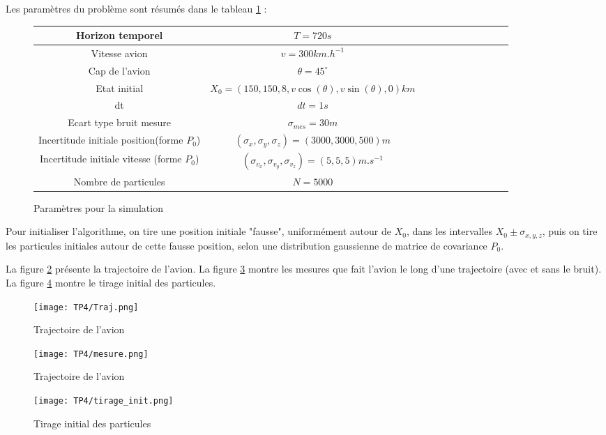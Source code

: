 \documentclass{article}
\begin{document}
Les paramètres du problème sont résumés dans le tableau \ref{paramètres2} : 


\begin{figure}[h!]
   \centering
   \caption{Paramètres pour la simulation}
   \label{paramètres2}
   \begin{tabular}{|*{11}{c|}}
     \hline Horizon temporel & $T = 720 s$ \\
     \hline Vitesse avion & $v=300 km.h^{-1}$\\
     \hline Cap de l'avion & $\theta = 45^\circ$\\
     \hline Etat initial & $X_0 =\left(150,150,8,v \cos(\theta),v \sin(\theta),0\right) km $\\ 
      \hline dt  & $dt = 1 s$ \\
      \hline Ecart type bruit mesure & $\sigma_{mes}=30 m$\\
      \hline Incertitude initiale position(forme $P_0$)& $(\sigma_x,\sigma_y,\sigma_z)=(3000,3000,500) m$\\
      \hline Incertitude initiale vitesse (forme $P_0$)&$(\sigma_{v_{x}},\sigma_{v_{y}},\sigma_{v_{z}})=(5,5,5) m.s^{-1}$\\
      \hline Nombre de particules & $N=5000$ \\
      \hline
   \end{tabular}
 \end{figure}
 
 Pour initialiser l'algorithme, on tire une position initiale "fausse", uniformément autour de $X_0$, dans les intervalles
 $X_0 \pm \sigma_{x,y,z}$, puis on tire les particules initiales autour de cette fausse position, selon une distribution gaussienne de matrice de covariance $P_0$.

 La figure \ref{traj} présente la trajectoire de l'avion. La figure \ref{mesure_alt} montre les mesures
 que fait l'avion le long d'une trajectoire (avec et sans le bruit). La figure \ref{particu} montre 
 le tirage initial des particules.

 \begin{figure}[h!]
   \centering
   \caption{Trajectoire de l'avion}
   \label{traj}
   \texttt{[image: TP4/Traj.png]}
 \end{figure}

 \begin{figure}[h!]
   \centering
   \caption{Trajectoire de l'avion}
   \label{mesure_alt}
   \texttt{[image: TP4/mesure.png]}
 \end{figure}

 \begin{figure}[h!]
   \centering
   \caption{Tirage initial des particules}
   \label{particu}
   \texttt{[image: TP4/tirage\_init.png]}
 \end{figure}
\end{document}
